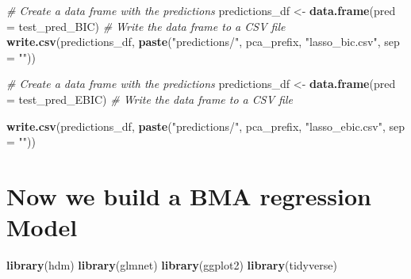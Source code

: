 \documentclass[
]{article}
\newenvironment{Shaded}{\begin{snugshade}}{\end{snugshade}}
\newcommand{\AttributeTok}[1]{\textcolor[rgb]{0.13,0.29,0.53}{#1}}
\newcommand{\CommentTok}[1]{\textcolor[rgb]{0.56,0.35,0.01}{\textit{#1}}}
\newcommand{\FunctionTok}[1]{\textcolor[rgb]{0.13,0.29,0.53}{\textbf{#1}}}
\newcommand{\NormalTok}[1]{#1}
\newcommand{\OtherTok}[1]{\textcolor[rgb]{0.56,0.35,0.01}{#1}}
\newcommand{\StringTok}[1]{\textcolor[rgb]{0.31,0.60,0.02}{#1}}
\begin{document}
\begin{Shaded}
\begin{Highlighting}[]
\CommentTok{\# Create a data frame with the predictions}
\NormalTok{predictions\_df }\OtherTok{\textless{}{-}} \FunctionTok{data.frame}\NormalTok{(}\AttributeTok{pred =}\NormalTok{ test\_pred\_BIC)}
\CommentTok{\# Write the data frame to a CSV file}
\FunctionTok{write.csv}\NormalTok{(predictions\_df, }\FunctionTok{paste}\NormalTok{(}\StringTok{"predictions/"}\NormalTok{, pca\_prefix, }\StringTok{"lasso\_bic.csv"}\NormalTok{, }\AttributeTok{sep =} \StringTok{""}\NormalTok{))}

\CommentTok{\# Create a data frame with the predictions}
\NormalTok{predictions\_df }\OtherTok{\textless{}{-}} \FunctionTok{data.frame}\NormalTok{(}\AttributeTok{pred =}\NormalTok{ test\_pred\_EBIC)}
\CommentTok{\# Write the data frame to a CSV file}


\FunctionTok{write.csv}\NormalTok{(predictions\_df, }\FunctionTok{paste}\NormalTok{(}\StringTok{"predictions/"}\NormalTok{, pca\_prefix, }\StringTok{"lasso\_ebic.csv"}\NormalTok{, }\AttributeTok{sep =} \StringTok{""}\NormalTok{))}
\end{Highlighting}
\end{Shaded}

\hypertarget{now-we-build-a-bma-regression-model}{%
\section{Now we build a BMA regression
Model}\label{now-we-build-a-bma-regression-model}}

\begin{Shaded}
\begin{Highlighting}[]
\FunctionTok{library}\NormalTok{(hdm)}
\FunctionTok{library}\NormalTok{(glmnet)}
\FunctionTok{library}\NormalTok{(ggplot2)}
\FunctionTok{library}\NormalTok{(tidyverse)}
\end{Highlighting}
\end{Shaded}
\end{document}
